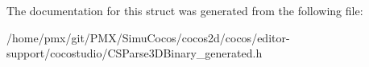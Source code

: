 The documentation for this struct was generated from the following file\+:\begin{DoxyCompactItemize}
\item 
/home/pmx/git/\+P\+M\+X/\+Simu\+Cocos/cocos2d/cocos/editor-\/support/cocostudio/C\+S\+Parse3\+D\+Binary\+\_\+generated.\+h\end{DoxyCompactItemize}
